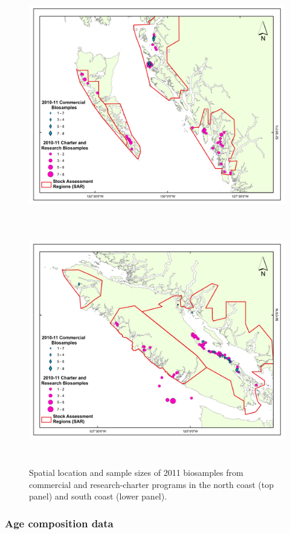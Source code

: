 \begin{figure}[htbp]
	\centering
		\includegraphics[height=4in]{../FIGS/2011_biosamples_maps/2011_biosamplesNC_SAR.pdf}
		\includegraphics[height=4in]{../FIGS/2011_biosamples_maps/2011_biosamplesSC_SAR.pdf}
		
	\caption{Spatial location and sample sizes of 2011 biosamples from commercial and research-charter programs in the north coast (top panel) and south coast (lower panel).}
	\label{fig:FIGS_2011_biosamples_maps_2011_biosamplesNC_SAR}
\end{figure}
	

	
	
	\subsubsection{Age composition data}
	
